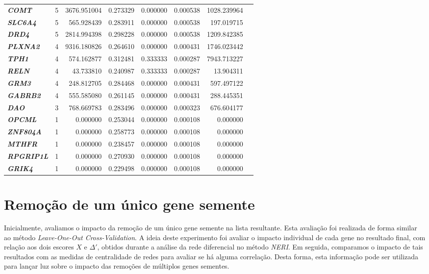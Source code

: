 \begin{table}[]
\begin{tabular}{@{}lrrrrrrr@{}}
\textbf{\textsl{COMT}}  &   5 &    3676.951004 & 0.273329 & 0.000000 & 0.000538 & 1028.239964 \\
\textbf{\textsl{SLC6A4}}  &   5 &     565.928439 & 0.283911 & 0.000000 & 0.000538 &  197.019715 \\
\textbf{\textsl{DRD4}}  &   5 &    2814.994398 & 0.298228 & 0.000000 & 0.000538 & 1209.842385 \\
\textbf{\textsl{PLXNA2}}  &   4 &    9316.180826 & 0.264610 & 0.000000 & 0.000431 & 1746.023442 \\
\textbf{\textsl{TPH1}}  &   4 &     574.162877 & 0.312481 & 0.333333 & 0.000287 & 7943.713227 \\
\textbf{\textsl{RELN}}  &   4 &      43.733810 & 0.240987 & 0.333333 & 0.000287 &   13.904311 \\
\textbf{\textsl{GRM3}}  &   4 &     248.812705 & 0.284468 & 0.000000 & 0.000431 &  597.497122 \\
\textbf{\textsl{GABRB2}}  &   4 &     555.585080 & 0.261145 & 0.000000 & 0.000431 &  288.445351 \\
\textbf{\textsl{DAO}}  &   3 &     768.669783 & 0.283496 & 0.000000 & 0.000323 &  676.604177 \\
\textbf{\textsl{OPCML}}  &   1 &       0.000000 & 0.253044 & 0.000000 & 0.000108 &    0.000000 \\
\textbf{\textsl{ZNF804A}}  &   1 &       0.000000 & 0.258773 & 0.000000 & 0.000108 &    0.000000 \\
\textbf{\textsl{MTHFR}}  &   1 &       0.000000 & 0.238457 & 0.000000 & 0.000108 &    0.000000 \\
\textbf{\textsl{RPGRIP1L}}  &   1 &       0.000000 & 0.270930 & 0.000000 & 0.000108 &    0.000000 \\
\textbf{\textsl{GRIK4}}  &   1 &       0.000000 & 0.229498 & 0.000000 & 0.000108 &    0.000000 \\ \bottomrule

\end{tabular}
\end{table}




\section{Remoção de um único gene semente}
%
Inicialmente, avaliamos o impacto da remoção de um único gene semente na lista resultante.
Esta avaliação foi realizada de forma similar ao método \textit{Leave-One-Out Cross-Validation}.
A ideia deste experimento foi avaliar o impacto individual de cada gene no resultado final, com relação aos dois escores $X$ e $\Delta'$, obtidos durante a análise da rede diferencial no método \textsl{NERI}.
Em seguida, comparamos o impacto de tais resultados com as medidas de centralidade de redes para avaliar se há alguma correlação.
Desta forma, esta informação pode ser utilizada para lançar luz sobre o impacto das remoções de múltiplos genes sementes.

